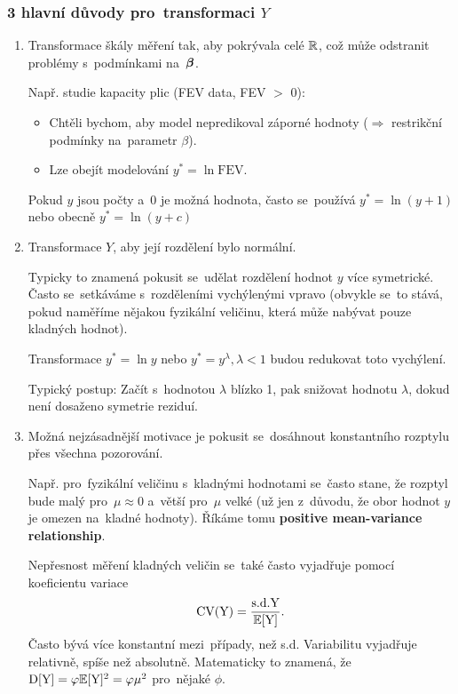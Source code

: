 \subsubsection{3 hlavní důvody pro~transformaci $Y$ }
\begin{enumerate}
	\item Transformace škály měření tak, aby pokrývala celé $\mathbb{R}$, což může odstranit problémy s~podmínkami na~$\boldsymbol{\beta}$.
	
	Např. studie kapacity plic (FEV data, FEV $>$ 0):
	\begin{itemize}
		\item Chtěli bychom, aby model nepredikoval záporné hodnoty ($\Rightarrow$ restrikční podmínky na~parametr $\beta$).
		\item Lze obejít modelování $y^* = \ln \mathrm{FEV}$.
	\end{itemize}

	Pokud $y$ jsou počty a~0 je možná hodnota, často se~používá $y^* = \ln (y+1)$ nebo obecně $y^* = \ln(y + c)$
	
	\item Transformace $Y$, aby její rozdělení bylo  normální.
	
	Typicky to znamená pokusit se~udělat rozdělení hodnot $y$ více symetrické. Často se~setkáváme s~rozděleními vychýlenými vpravo (obvykle se~to stává, pokud naměříme nějakou fyzikální veličinu, která může nabývat pouze kladných hodnot).
	
	Transformace $y^* = \ln y$ nebo $y^* = y^{\lambda}, \lambda < 1$ budou redukovat toto vychýlení.
	
	Typický postup: Začít s~hodnotou $\lambda$ blízko 1, pak snižovat hodnotu $\lambda$, dokud není dosaženo  symetrie reziduí.
	
	\item Možná nejzásadnější motivace je pokusit se~dosáhnout konstantního rozptylu přes všechna pozorování.
	
	Např. pro~fyzikální veličinu s~kladnými hodnotami se~často stane, že rozptyl bude malý pro~$\mu \approx 0$ a~větší pro~$\mu$ velké (už jen z~důvodu, že obor hodnot $y$ je omezen na~kladné hodnoty). Říkáme tomu \textbf{positive mean-variance relationship}.
	
  Nepřesnost měření kladných veličin se~také často vyjadřuje pomocí koeficientu variace
 $$
 \text{CV}(\text{Y}) = \frac{\text{s.d.} \text{Y}}{\mathbb{E}[\text{Y}]}.
 $$
Často bývá více konstantní mezi~případy, než s.d. Variabilitu vyjadřuje relativně, spíše než absolutně. Matematicky to znamená, že $\mathrm{D}[\text{Y}] = \varphi \mathbb{E}[\text{Y}]^2 = \varphi \mu^2$ pro~nějaké $\phi$.


\end{enumerate}
